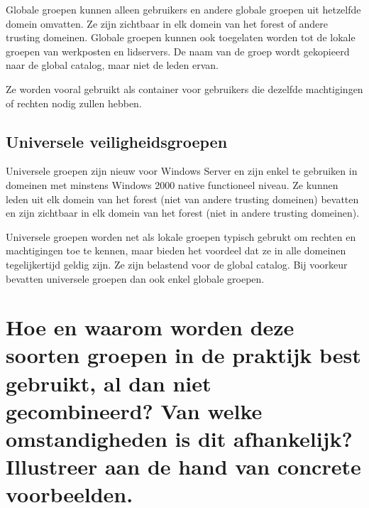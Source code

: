 Globale groepen kunnen alleen gebruikers en andere globale groepen uit hetzelfde
domein omvatten. Ze zijn zichtbaar in elk domein van het forest of andere
trusting domeinen. Globale groepen kunnen ook toegelaten worden tot de lokale
groepen van werkposten en lidservers. De naam van de groep wordt gekopieerd naar
de global catalog, maar niet de leden ervan.

Ze worden vooral gebruikt als container voor gebruikers die dezelfde
machtigingen of rechten nodig zullen hebben.

\subsection{Universele veiligheidsgroepen}

Universele groepen zijn nieuw voor Windows Server en zijn enkel te gebruiken in
domeinen met minstens Windows 2000 native functioneel niveau. Ze kunnen leden
uit elk domein van het forest (niet van andere trusting domeinen) bevatten en
zijn zichtbaar in elk domein van het forest (niet in andere trusting domeinen).

Universele groepen worden net als lokale groepen typisch gebrukt om rechten en
machtigingen toe te kennen, maar bieden het voordeel dat ze in alle domeinen
tegelijkertijd geldig zijn. Ze zijn belastend voor de global catalog. Bij
voorkeur bevatten universele groepen dan ook enkel globale groepen.

\section{Hoe en waarom worden deze soorten groepen in de praktijk best gebruikt,
al dan niet gecombineerd? Van welke omstandigheden is dit afhankelijk?
Illustreer aan de hand van concrete voorbeelden.}

